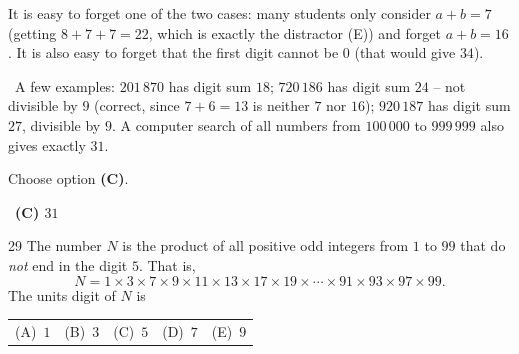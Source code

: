 \documentclass[11pt]{article}
\makeatletter
\providecommand{\AnsWord}{Đáp số}
\newcommand{\ans}[1]{\par\smallskip{\bfseries\color{tmGreen!88!black}\AnsWord:}\ {\bfseries\color{AnsRed}#1}\par}
\newcommand{\verify}[1]{\par\smallskip\noindent{\bfseries\color{tmGreen!80!black}\faCheckCircle\ \CheckWord}\ #1\par}
\newcommand{\choices}[5]{\par\smallskip\noindent
  \begin{tabularx}{\linewidth}{@{}XXXXX@{}}(A)\ #1&(B)\ #2&(C)\ #3&(D)\ #4&(E)\ #5\end{tabularx}\par}
\def\AnsWord{Answer}
\def\CheckWord{Check:}
\makeatother
\begin{document}
{\begin{warnbox}It is easy to forget one of the two cases: many students only consider $a+b=7$ (getting $8+7+7=22$, which is exactly the distractor (E)) and forget $a+b=16$. It is also easy to forget that the first digit cannot be $0$ (that would give $34$).\end{warnbox}

\verify{A few examples: $201\,870$ has digit sum $18$; $720\,186$ has digit sum $24$ -- not divisible by $9$ (correct, since $7+6=13$ is neither $7$ nor $16$); $920\,187$ has digit sum $27$, divisible by $9$. A computer search of all numbers from $100\,000$ to $999\,999$ also gives exactly $31$.}
Choose option \textbf{(C)}.
\ans{(C) $31$}
}

\begin{probbox}{29}{\relax}
The number $N$ is the product of all positive odd integers from $1$ to $99$ that do \emph{not} end in the digit $5$. That is,
\[N=1\times 3\times 7\times 9\times 11\times 13\times 17\times 19\times\cdots\times 91\times 93\times 97\times 99.\]
The units digit of $N$ is
\choices{$1$}{$3$}{$5$}{$7$}{$9$}
\end{probbox}
\end{document}
